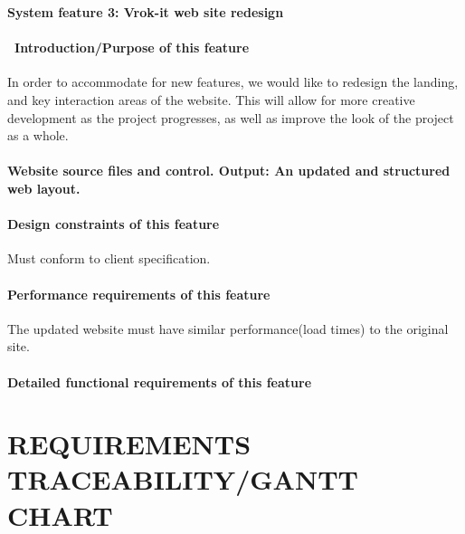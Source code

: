 \documentclass[letterpaper, 10pt, draftclsnofoot, onecolumn]{IEEEtran}
\begin{document}
{%
{\rmfamily\bfseries\color{black} System
feature 3: Vrok-it  web site redesign}
\paragraph[\ Introduction/Purpose of this
feature]{\foreignlanguage{english}{\ }\foreignlanguage{english}{Introduction/Purpose
of this feature}}
{\color{black}
In order to accommodate for new features, we would like to redesign the landing,
and key interaction areas of the website. This will allow for more creative development
as the project progresses, as well as improve the look of the project as a whole.}

\paragraph[Input/Output sequence for this
feature]{\rmfamily\bfseries\color{black}
Website source files and control. Output: An updated and structured web layout.}

\paragraph[Design constraints of this
feature]{\rmfamily\bfseries\color{black} Design
constraints of this feature}
{\color{black}
Must conform to client specification.}

\paragraph[Performance requirements of this
feature]{\rmfamily\bfseries\color{black}
Performance requirements of this feature}
{\color{black}
The updated website must have similar performance(load times) to the original site.}

\paragraph[Detailed functional requirements of this
feature]{\rmfamily\bfseries\color{black}
Detailed functional requirements of this feature}








\clearpage\setcounter{page}{1}\pagestyle{Convertvi}
\section[REQUIREMENTS
TRACEABILITY]{\rmfamily\bfseries\color{black}
REQUIREMENTS TRACEABILITY/GANTT CHART}

}
\end{document}
